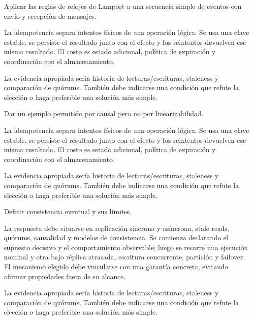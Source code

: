 \documentclass[variant=guia,cover=institutional,mode=screen]{ua-engineering-v6-article}
\begin{document}
\begin{uaexercise}
Aplicar las reglas de relojes de Lamport a una secuencia simple de eventos con envío y recepción de mensajes.
\end{uaexercise}
\begin{uaanswer}
La idempotencia separa intentos físicos de una operación lógica. Se usa una clave estable, se persiste el resultado junto con el efecto y los reintentos devuelven ese mismo resultado. El costo es estado adicional, política de expiración y coordinación con el almacenamiento.

La evidencia apropiada sería historia de lecturas/escrituras, staleness y comparación de quórums. También debe indicarse una condición que refute la elección o haga preferible una solución más simple.
\end{uaanswer}

\begin{uaexercise}
Dar un ejemplo permitido por causal pero no por linearizabilidad.
\end{uaexercise}
\begin{uaanswer}
La idempotencia separa intentos físicos de una operación lógica. Se usa una clave estable, se persiste el resultado junto con el efecto y los reintentos devuelven ese mismo resultado. El costo es estado adicional, política de expiración y coordinación con el almacenamiento.

La evidencia apropiada sería historia de lecturas/escrituras, staleness y comparación de quórums. También debe indicarse una condición que refute la elección o haga preferible una solución más simple.
\end{uaanswer}

\begin{uaexercise}
Definir consistencia eventual y sus límites.
\end{uaexercise}
\begin{uaanswer}
La respuesta debe situarse en replicación síncrona y asíncrona, stale reads, quórums, causalidad y modelos de consistencia. Se comienza declarando el supuesto decisivo y el comportamiento observable; luego se recorre una ejecución nominal y otra bajo réplica atrasada, escritura concurrente, partición y failover. El mecanismo elegido debe vincularse con una garantía concreta, evitando afirmar propiedades fuera de su alcance.

La evidencia apropiada sería historia de lecturas/escrituras, staleness y comparación de quórums. También debe indicarse una condición que refute la elección o haga preferible una solución más simple.
\end{uaanswer}
\end{document}
